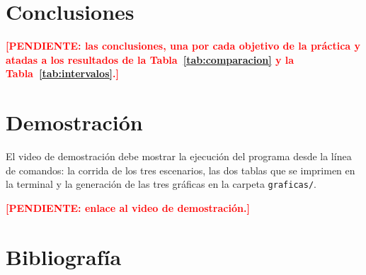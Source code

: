 \documentclass[11pt,a4paper]{article}
\newcommand{\pendiente}[1]{\textcolor{red}{\textbf{[PENDIENTE: #1]}}}
\begin{document}
\section{Conclusiones}

\pendiente{las conclusiones, una por cada objetivo de la práctica y atadas a los
resultados de la Tabla~\ref{tab:comparacion} y la Tabla~\ref{tab:intervalos}.}

\section{Demostración}

El video de demostración debe mostrar la ejecución del programa desde la línea de
comandos: la corrida de los tres escenarios, las dos tablas que se imprimen en la
terminal y la generación de las tres gráficas en la carpeta \texttt{graficas/}.

\pendiente{enlace al video de demostración.}

\section{Bibliografía}

\nocite{*}


\end{document}
